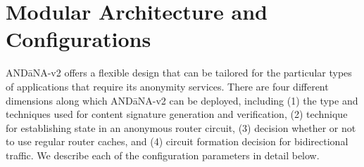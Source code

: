 \documentclass[10pt]{article}
\begin{document}


\section{Modular Architecture and Configurations}
{\sf AND\=aNA-v2} offers a flexible design that can be tailored for the particular types of applications that require its anonymity services. There are four different dimensions along which {\sf AND\=aNA-v2} can be deployed, including (1) the type and techniques used for content signature generation and verification, (2) technique for establishing state in an anonymous router circuit, (3) decision whether or not to use regular router caches, and (4) circuit formation decision for bidirectional traffic. We describe each of the configuration parameters in detail below.
\end{document}
